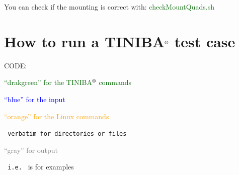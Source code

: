 \documentclass[12pt]{article}
\numberwithin{equation}{section}
\begin{document}
You can check if the mounting is correct with:
\textcolor{darkgreen}{checkMountQuads.sh} 

\section{How to run a TINIBA${\reg}$ test case}

CODE:

\textcolor{darkgreen}{``drakgreen'' for the TINIBA${\reg}$ commands}

\textcolor{blue}{``blue'' for the input}

\textcolor{orange}{``orange'' for the Linux commands}

\verb= verbatim for directories or files=

\textcolor{gray}{``gray'' for output}

\verb= i.e. = is for examples\\
\end{document}

